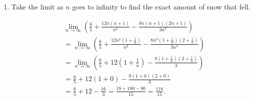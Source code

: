 \documentclass[nooutcomes]{ximera}
\begin{document}
\begin{problem}
\begin{enumerate}
	\item  Take the limit as $n$ goes to infinity to find the exact amount of snow that fell.
		\begin{freeResponse}
			\begin{align*}
			&  \lim_{n \to \infty} \left( \frac{6}{5} + \frac{12n(n+1)}{n^2} - \frac{8n(n+1)(2n+1)}{3n^3} \right)  \\
			&= \lim_{n \to \infty} \left( \frac{6}{5} + \frac{12n^2(1+\frac{1}{n})}{n^2} - \frac{8n^3(1+\frac{1}{n})(2+\frac{1}{n})}{3n^3} \right)  \\
			&= \lim_{n \to \infty} \left( \frac{6}{5} + 12 \left( 1 + \frac{1}{n} \right) - \frac{8(1 + \frac{1}{n})(2 + \frac{1}{n})}{3} \right)  \\
			&= \frac{6}{5} + 12(1 + 0) - \frac{8(1+0)(2+0)}{3}  \\
			&= \frac{6}{5} + 12 - \frac{16}{3} = \frac{18 + 180 - 80}{15} = \frac{118}{15}.
			\end{align*}
		\end{freeResponse}
		
		
		
	\end{enumerate}
		
		
\end{problem}
\end{document}
